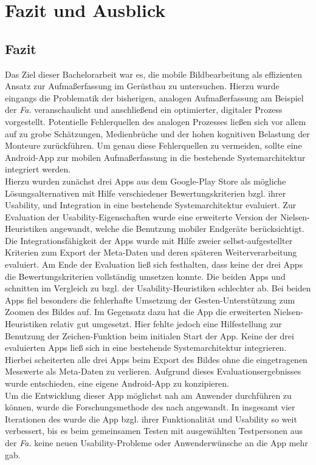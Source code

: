 \chapter{Fazit und Ausblick}
\section{Fazit}
Das Ziel dieser Bachelorarbeit war es, die mobile Bildbearbeitung als effizienten Ansatz zur Aufmaßerfassung im Gerüstbau zu untersuchen.
Hierzu wurde eingangs die Problematik der bisherigen, analogen Aufmaßerfassung am Beispiel der \emph{Fa.} \vr{} veranschaulicht und anschließend ein optimierter, digitaler Prozess vorgestellt.
Potentielle Fehlerquellen des analogen Prozesses ließen sich vor allem auf zu grobe Schätzungen, Medienbrüche und der hohen kognitiven Belastung der Monteure zurückführen.
Um genau diese Fehlerquellen zu vermeiden, sollte eine Android-App zur mobilen Aufmaßerfassung in die bestehende Systemarchitektur integriert werden. \\

Hierzu wurden zunächst drei Apps aus dem Google-Play Store als mögliche Lösungsalternativen mit Hilfe verschiedener Bewertungskriterien bzgl. ihrer Usability, und Integration in eine bestehende Systemarchitektur evaluiert.
Zur Evaluation der Usability-Eigenschaften wurde eine erweiterte Version der Nielsen-Heuristiken angewandt, welche die Benutzung mobiler Endgeräte berücksichtigt.
Die Integrationsfähigkeit der Apps wurde mit Hilfe zweier selbst-aufgestellter Kriterien zum Export der Meta-Daten und deren späteren Weiterverarbeitung evaluiert.
Am Ende der Evaluation ließ sich festhalten, dass keine der drei Apps die Bewertungskriterien vollständig umsetzen konnte.
Die beiden Apps \mm{} und \pm{} schnitten im Vergleich zu \im{} bzgl. der Usability-Heuristiken schlechter ab.
Bei beiden Apps fiel besonders die fehlerhafte Umsetzung der Gesten-Unterstützung zum Zoomen des Bildes auf.
Im Gegensatz dazu hat die App \im{} die erweiterten Nielsen-Heuristiken relativ gut umgesetzt.
Hier fehlte jedoch eine Hilfestellung zur Benutzung der Zeichen-Funktion beim initialen Start der App.
Keine der drei evaluierten Apps ließ sich in eine bestehende Systemarchitektur integrieren.
Hierbei scheiterten alle drei Apps beim Export des Bildes ohne die eingetragenen Messwerte als Meta-Daten zu verlieren.
Aufgrund dieses Evaluationsergebnisses wurde entschieden, eine eigene Android-App zu konzipieren. \\

Um die Entwicklung dieser App möglichst nah am Anwender durchführen zu können, wurde die Forschungsmethode des \hcdp{} nach \citet{Norman13} angewandt.
In insgesamt vier Iterationen des \hcdp{} wurde die App bzgl. ihrer Funktionalität und Usability so weit verbessert, bis es beim gemeinsamen Testen mit ausgewählten Testpersonen aus der \emph{Fa.} \vr{} keine neuen Usability-Probleme oder Anwenderwünsche an die App mehr gab. \\

